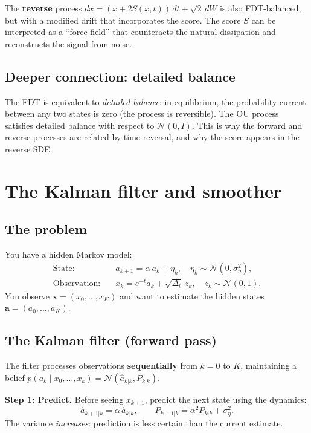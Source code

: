 \documentclass[11pt,a4paper]{article}
\newcommand{\Dt}{\Delta_t}
\newcommand{\sigeta}{\sigma_\eta^2}
\begin{document}
The \textbf{reverse} process $dx = (x + 2S(x,t))\,dt + \sqrt{2}\,dW$ is also FDT-balanced, but with a modified drift that incorporates the score.  The score $S$ can be interpreted as a ``force field'' that counteracts the natural dissipation and reconstructs the signal from noise.

\subsection{Deeper connection: detailed balance}

The FDT is equivalent to \emph{detailed balance}: in equilibrium, the probability current between any two states is zero (the process is reversible).  The OU process satisfies detailed balance with respect to $\mathcal{N}(0, I)$.  This is why the forward and reverse processes are related by time reversal, and why the score appears in the reverse SDE.


\section{The Kalman filter and smoother}
\label{sec:q30}

\subsection{The problem}

You have a hidden Markov model:
\begin{align}
  \text{State:} &\quad a_{k+1} = \alpha\,a_k + \eta_k, \quad \eta_k \sim \mathcal{N}(0, \sigeta), \\
  \text{Observation:} &\quad x_k = e^{-t}a_k + \sqrt{\Dt}\,z_k, \quad z_k \sim \mathcal{N}(0, 1).
\end{align}
You observe $\mathbf{x} = (x_0, \dots, x_K)$ and want to estimate the hidden states $\mathbf{a} = (a_0, \dots, a_K)$.

\subsection{The Kalman filter (forward pass)}

The filter processes observations \textbf{sequentially} from $k = 0$ to $K$, maintaining a belief $p(a_k \mid x_0, \dots, x_k) = \mathcal{N}(\hat{a}_{k|k}, P_{k|k})$.

\textbf{Step 1: Predict.}  Before seeing $x_{k+1}$, predict the next state using the dynamics:
\begin{equation}
  \hat{a}_{k+1|k} = \alpha\,\hat{a}_{k|k}, \qquad P_{k+1|k} = \alpha^2 P_{k|k} + \sigeta.
\end{equation}
The variance \emph{increases}: prediction is less certain than the current estimate.
\end{document}
